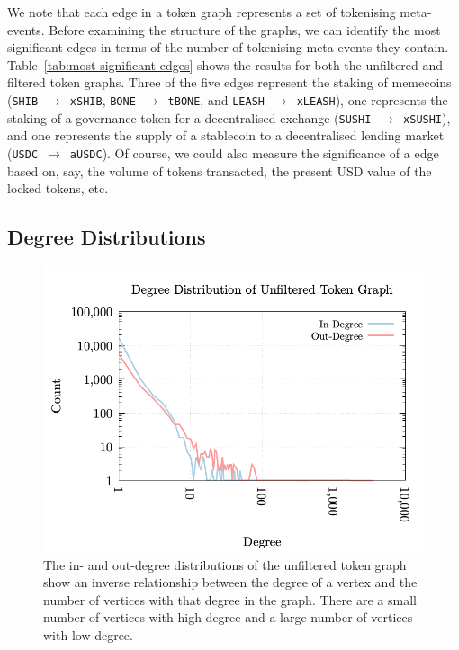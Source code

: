 We note that each edge in a token graph represents a set of tokenising
meta-events.  Before examining the structure of the graphs, we can
identify the most significant edges in terms of the number of
tokenising meta-events they contain.
Table~\ref{tab:most-significant-edges} shows the results for both the
unfiltered and filtered token graphs.  Three of the five edges
represent the staking of memecoins
(\texttt{SHIB}~$\rightarrow$~\texttt{xSHIB},
\texttt{BONE}~$\rightarrow$~\texttt{tBONE}, and
\texttt{LEASH}~$\rightarrow$~\texttt{xLEASH}), one represents the
staking of a governance token for a decentralised exchange
(\texttt{SUSHI}~$\rightarrow$~\texttt{xSUSHI}), and one represents the
supply of a stablecoin to a decentralised lending market
(\texttt{USDC}~$\rightarrow$~\texttt{aUSDC}).  Of course, we could
also measure the significance of a edge based on, say, the volume of
tokens transacted, the present USD value of the locked tokens, etc.

\subsection{Degree Distributions}\label{sec:analysis-degree-distribution}

\begin{figure}
  \centerline{\includegraphics[width=\columnwidth]{img/degree-distributions/unfiltered-token-graph-degrees.png}}
  \caption{The in- and out-degree distributions of the unfiltered
    token graph show an inverse relationship between the degree of a
    vertex and the number of vertices with that degree in the graph.
    There are a small number of vertices with high degree and a large
    number of vertices with low
    degree.}\label{fig:unfiltered-token-graph-degrees}
\end{figure}


